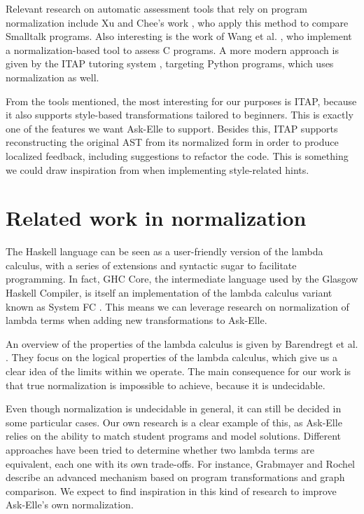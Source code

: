 Relevant research on automatic assessment tools that rely on program normalization include Xu and Chee's work \cite{2003transformation}, who apply this method to compare Smalltalk programs. Also interesting is the work of Wang et al. \cite{2007wang}, who implement a normalization-based tool to assess C programs. A more modern approach is given by the ITAP tutoring system \cite{2017ITAP}, targeting Python programs, which uses normalization as well.

From the tools mentioned, the most interesting for our purposes is ITAP, because it also supports style-based transformations tailored to beginners. This is exactly one of the features we want Ask-Elle to support. Besides this, ITAP supports reconstructing the original AST from its normalized form in order to produce localized feedback, including suggestions to refactor the code. This is something we could draw inspiration from when implementing style-related hints.

\section{Related work in normalization}

The Haskell language can be seen as a user-friendly version of the lambda calculus, with a series of extensions and syntactic sugar to facilitate programming. In fact, GHC Core, the intermediate language used by the Glasgow Haskell Compiler, is itself an implementation of the lambda calculus variant known as System FC \cite{2007systemfc}. This means we can leverage research on normalization of lambda terms when adding new transformations to Ask-Elle.

An overview of the properties of the lambda calculus is given by Barendregt et al. \cite{2013lambda}. They focus on the logical properties of the lambda calculus, which give us a clear idea of the limits within we operate. The main consequence for our work is that true normalization is impossible to achieve, because it is undecidable.

Even though normalization is undecidable in general, it can still be decided in some particular cases. Our own research is a clear example of this, as Ask-Elle relies on the ability to match student programs and model solutions. Different approaches have been tried to determine whether two lambda terms are equivalent, each one with its own trade-offs. For instance, Grabmayer and Rochel \cite{2014letrec} describe an advanced mechanism based on program transformations and graph comparison. We expect to find inspiration in this kind of research to improve Ask-Elle's own normalization.

